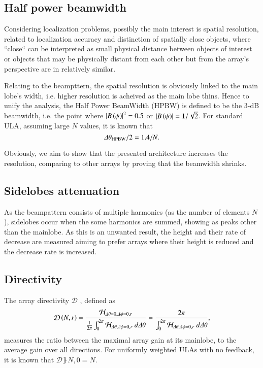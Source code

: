 \subsection{Half power beamwidth}
Considering localization problems, possibly the main interest is spatial resolution, related to localization accuracy and distinction of spatially close objects, where ``close`` can be interpreted as small physical distance between objects of interest or objects that may be physically distant from each other but from the array's perspective are in relatively similar.
\par
Relating to the beampttern, the spatial resolution is obviously linked to the main lobe's width, i.e. higher resolution is acheived as the main lobe thins. 
Hence to unify the analysis, the Half Power BeamWidth (HPBW) is defined to be the 3-dB beamwidth, i.e. the point where $\left\vert B\left({\psi}\right)\right\vert^{2} = 0.5$ or $\left\vert B\left({\psi}\right)\right\vert = 1/\sqrt{2}$.
For standard ULA, assuming large $N$ values, it is known \cite{van2004optimum} that
\begin{equation}
    \label{eq_known_HBPW}
    \Delta\theta_{\text{HPBW}}/2= 1.4/N.
\end{equation}
\par
Obviously, we aim to show that the presented architecture increases the resolution, comparing to other arrays by proving that the beamwidth shrinks.
%
%
%
\subsection{Sidelobes attenuation}
As the beampattern consists of multiple harmonics (as the number of elements $N$), sidelobes occur when the some harmonics are summed, showing as peaks other than the mainlobe.
As this is an unwanted result, the height and their rate of decrease are measured aiming to prefer arrays where their height is reduced and the decrease rate is increased.
%
%
%
\subsection{Directivity}
The array directivity $\mathcal{D}$ \cite{van2004optimum}, defined as
\begin{equation}\label{eq_D}
    \mathcal{D}\rBrace{N,r} = \frac{\Hr_{\Delta\theta=0,\Delta\phi=0,r}}{\frac{1}{2\pi}\int_{0}^{2\pi}\Hr_{\Delta\theta,\Delta\phi=0,r}\ d\Delta\theta} = \frac{2\pi}{\int_{0}^{2\pi}\Hr_{\Delta\theta,\Delta\phi=0,r}\ d\Delta\theta},
\end{equation}
measures the ratio between the maximal array gain at its mainlobe, to the average gain over all directions. 
For uniformly weighted ULAs with no feedback, it is known \cite{van2004optimum} that $\mathcal{D}\rBrace{N,0} = N$.
